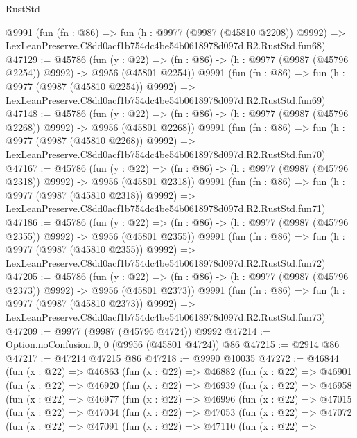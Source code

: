 \begin{lexlean}{RustStd}
\begin{coremodule}
    @9991
    (fun (fn : @86) =>
    fun (h : @9977 (@9987 (@45810 @2208)) @9992) =>
    LexLeanPreserve.C8dd0acf1b754dc4be54b0618978d097d.R2.RustStd.fun68)
@47129 := @45786
    (fun (y : @22) =>
    (fn : @86) -> (h : @9977 (@9987 (@45796 @2254)) @9992) -> @9956 (@45801 @2254))
    @9991
    (fun (fn : @86) =>
    fun (h : @9977 (@9987 (@45810 @2254)) @9992) =>
    LexLeanPreserve.C8dd0acf1b754dc4be54b0618978d097d.R2.RustStd.fun69)
@47148 := @45786
    (fun (y : @22) =>
    (fn : @86) -> (h : @9977 (@9987 (@45796 @2268)) @9992) -> @9956 (@45801 @2268))
    @9991
    (fun (fn : @86) =>
    fun (h : @9977 (@9987 (@45810 @2268)) @9992) =>
    LexLeanPreserve.C8dd0acf1b754dc4be54b0618978d097d.R2.RustStd.fun70)
@47167 := @45786
    (fun (y : @22) =>
    (fn : @86) -> (h : @9977 (@9987 (@45796 @2318)) @9992) -> @9956 (@45801 @2318))
    @9991
    (fun (fn : @86) =>
    fun (h : @9977 (@9987 (@45810 @2318)) @9992) =>
    LexLeanPreserve.C8dd0acf1b754dc4be54b0618978d097d.R2.RustStd.fun71)
@47186 := @45786
    (fun (y : @22) =>
    (fn : @86) -> (h : @9977 (@9987 (@45796 @2355)) @9992) -> @9956 (@45801 @2355))
    @9991
    (fun (fn : @86) =>
    fun (h : @9977 (@9987 (@45810 @2355)) @9992) =>
    LexLeanPreserve.C8dd0acf1b754dc4be54b0618978d097d.R2.RustStd.fun72)
@47205 := @45786
    (fun (y : @22) =>
    (fn : @86) -> (h : @9977 (@9987 (@45796 @2373)) @9992) -> @9956 (@45801 @2373))
    @9991
    (fun (fn : @86) =>
    fun (h : @9977 (@9987 (@45810 @2373)) @9992) =>
    LexLeanPreserve.C8dd0acf1b754dc4be54b0618978d097d.R2.RustStd.fun73)
@47209 := @9977 (@9987 (@45796 @4724)) @9992
@47214 := Option.noConfusion.{0, 0} (@9956 (@45801 @4724)) @86
@47215 := @2914 @86
@47217 := @47214 @47215 @86
@47218 := @9990 @10035
@47272 := @46844
    (fun (x : @22) =>
    @46863
      (fun (x : @22) =>
      @46882
        (fun (x : @22) =>
        @46901
          (fun (x : @22) =>
          @46920
            (fun (x : @22) =>
            @46939
              (fun (x : @22) =>
              @46958
                (fun (x : @22) =>
                @46977
                  (fun (x : @22) =>
                  @46996
                    (fun (x : @22) =>
                    @47015
                      (fun (x : @22) =>
                      @47034
                        (fun (x : @22) =>
                        @47053
                          (fun (x : @22) =>
                          @47072
                            (fun (x : @22) =>
                            @47091
                              (fun (x : @22) =>
                              @47110
                                (fun (x : @22) =>

\end{coremodule}
\end{lexlean}
